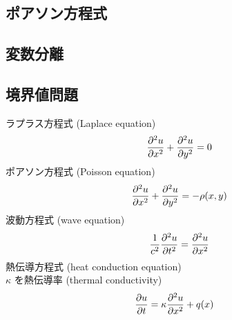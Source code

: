 \documentclass[uplatex,dvipdfmx,a4paper,11pt]{jlreq}
\theoremstyle{definition}
\begin{document}
\subsection{ポアソン方程式}

\subsection{変数分離}

\subsection{境界値問題}
\begin{definition}
  ラプラス方程式 (Laplace equation)
  \begin{align}
    \pdv[2]{u}{x} + \pdv[2]{u}{y} = 0
  \end{align}
  ポアソン方程式 (Poisson equation)
  \begin{align}
    \pdv[2]{u}{x} + \pdv[2]{u}{y} = -\rho(x, y)
  \end{align}
  波動方程式 (wave equation)
  \begin{align}
    \frac{1}{c^2}\pdv[2]{u}{t} = \pdv[2]{u}{x}
  \end{align}
  熱伝導方程式 (heat conduction equation) \\
  $\kappa$ を熱伝導率 (thermal conductivity)
  \begin{align}
    \pdv{u}{t} & = \kappa\pdv[2]{u}{x} + q(x)
  \end{align}
\end{definition}
\end{document}
